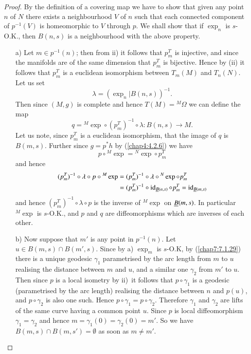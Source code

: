 \begin{proof}
By the definition of a covering map we have to show that given any
point $n$ of $N$ there exists a neighbourhood $V$ of $n$ such that
each connected component of $p^{-1}(V)$ is homeomorphic to $V$ through
$p$. We \pageoriginale shall show that if $\exp_{n}$ is $s$-O.K., then
$B(n,s)$ is a neighbourhood with the above property.
\begin{itemize}
\item[a)] Let $m\in p^{-1}(n)$; then from ii) it follows that
$p^{T}_{m}$ is injective, and since the manifolds are of the same
dimension that $p^{T}_{m}$ is bijective. Hence by (ii) it follows that
$p^{T}_{m}$ is a euclidean isomorphism between $T_{m}(M)$ and
$T_{n}(N)$. Let us set
$$
\lambda=(\exp_{n}|B(n,s))^{-1}.
$$
Then since $(M,g)$ is complete and hence $T(M)={}^{M}\Omega$ we can
define the map
$$
q={}^{M}\exp\circ (p^{T}_{m})^{-1}\circ \lambda:B(n,s)\to M.
$$
Let us note, since $p^{T}_{m}$ is a euclidean isomorphism, that the
image of $q$ is $B(m,s)$. Further since $g=p^{\ast}h$ by
(\ref{chap4:4.2.6}) we have
$$
p\circ {}^{M}\exp ={}^{N}\exp \circ p^{T}_{m}
$$
and hence
\begin{align*}
(p^{T}_{m})^{-1}\circ\lambda\circ p\circ
{}^{M}\exp&=(p^{T}_{m})^{-1}\circ\lambda\circ {}^{N}\exp\circ
p^{T}_{m}\\
&=(p^{T}_{m})^{-1}\circ \operatorname{id}_{\underline{B}(n,s)}\circ p^{T}_{m}=\operatorname{id}_{\underline{B}(m,s)}
\end{align*}
and hence $(p^{T}_{m})^{-1}\circ \lambda\circ p$ is the inverse of
${}^{M}\exp$ on $\underline{B}(m,s)$. In particular ${}^{M}\exp$ is $s$-O.K.,
and $p$ and $q$ are diffeomorphisms which are inverses of each other.

\item[b)] Now suppose that $m'$ is any point in $p^{-1}(n)$. Let $u\in
  B(m,s)\cap B(m',s)$. Since by a) $\exp_{m}$ is $s$-O.K, by
  (\ref{chap7:7.1.29}) there is a unique geodesic $\gamma_{1}$
  parametrised by the arc length from $m$ to $u$ realising the
  distance between $m$ and $u$, and a similar one $\gamma_{2}$
  from \pageoriginale $m'$ to $u$. Then since $p$ is a local isometry
  by ii)~it follows that $p\circ\gamma_{1}$ is a geodesic
  (parametrised by the arc length) realising the distance between $n$
  and $p(u)$, and $p\circ\gamma_{2}$ is also one such. Hence
  $p\circ\gamma_{1}=p\circ\gamma_{2}$. Therefore $\gamma_{1}$ and
  $\gamma_{2}$ are lifts of the same curve having a common point
  $u$. Since $p$ is local diffeomorphism $\gamma_{1}=\gamma_{2}$ and
  hence $m=\gamma_{1}(0)=\gamma_{2}(0)=m'$. So we have $B(m,s)\cap
  B(m,s')=\emptyset$ as soon as $m\neq m'$.


\end{itemize}
\end{proof}
